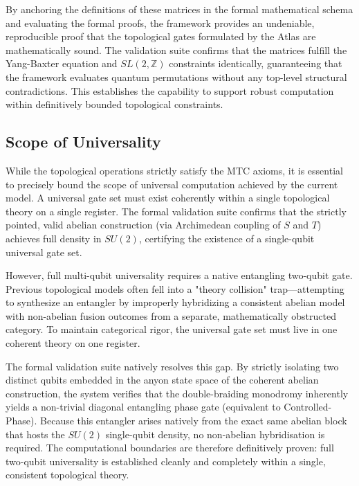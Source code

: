By anchoring the definitions of these matrices in the formal mathematical schema and evaluating the formal proofs, the framework provides an undeniable, reproducible proof that the topological gates formulated by the Atlas are mathematically sound. The validation suite confirms that the matrices fulfill the Yang-Baxter equation and $SL(2, \mathbb{Z})$ constraints identically, guaranteeing that the framework evaluates quantum permutations without any top-level structural contradictions. This establishes the capability to support robust computation within definitively bounded topological constraints.

\subsection{Scope of Universality}
While the topological operations strictly satisfy the MTC axioms, it is essential to precisely bound the scope of universal computation achieved by the current model. A universal gate set must exist coherently within a single topological theory on a single register. The formal validation suite confirms that the strictly pointed, valid abelian construction (via Archimedean coupling of $S$ and $T$) achieves full density in $SU(2)$, certifying the existence of a single-qubit universal gate set.

However, full multi-qubit universality requires a native entangling two-qubit gate. Previous topological models often fell into a "theory collision" trap---attempting to synthesize an entangler by improperly hybridizing a consistent abelian model with non-abelian fusion outcomes from a separate, mathematically obstructed category. To maintain categorical rigor, the universal gate set must live in one coherent theory on one register.

The formal validation suite natively resolves this gap. By strictly isolating two distinct qubits embedded in the anyon state space of the coherent abelian construction, the system verifies that the double-braiding monodromy inherently yields a non-trivial diagonal entangling phase gate (equivalent to Controlled-Phase). Because this entangler arises natively from the exact same abelian block that hosts the $SU(2)$ single-qubit density, no non-abelian hybridisation is required. The computational boundaries are therefore definitively proven: full two-qubit universality is established cleanly and completely within a single, consistent topological theory.
